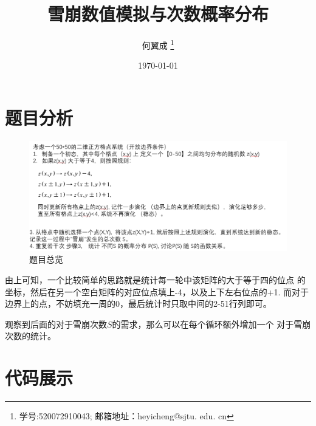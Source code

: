 \documentclass[UTF8,a4paper,10pt]{ctexart}
\title{\textbf{雪崩数值模拟与次数概率分布}}
\author{ 何翼成 \thanks{学号:520072910043; \newline
    邮箱地址：heyicheng@sjtu. edu. cn} }
\date{\today}
\begin{document}
\maketitle


\section{题目分析}
	\begin{figure}[!htbp]
		\centering
		\includegraphics[width=1\textwidth,height=0.5\textwidth]{pictures/project.png}
		\caption{题目总览} \label{project}
	\end{figure}
  
  \newline

  由上可知，一个比较简单的思路就是统计每一轮中该矩阵的大于等于四的位点
  的坐标，然后在另一个空白矩阵的对应位点填上-4，以及上下左右位点的+1.
  而对于边界上的点，不妨填充一周的0，最后统计时只取中间的2-51行列即可。\newline

  观察到后面的对于雪崩次数$S$的需求，那么可以在每个循环额外增加一个
  对于雪崩次数的统计。\newline
\section{代码展示}
\end{document}
